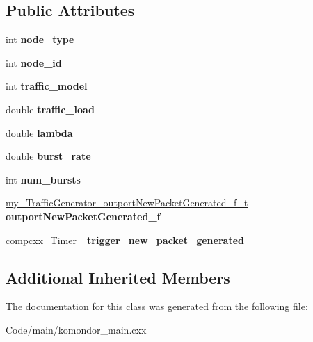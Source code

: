 \subsection*{Public Attributes}
\begin{DoxyCompactItemize}
\item 
\mbox{\label{classcompcxx__TrafficGenerator__24_af8971efad80942b705374072e1f67e58}} 
int {\bfseries node\+\_\+type}
\item 
\mbox{\label{classcompcxx__TrafficGenerator__24_a1f31dd054a79eb90a70db759bb98e9d0}} 
int {\bfseries node\+\_\+id}
\item 
\mbox{\label{classcompcxx__TrafficGenerator__24_a7f36e33fcc5ce1de6a5d1ad3526fd519}} 
int {\bfseries traffic\+\_\+model}
\item 
\mbox{\label{classcompcxx__TrafficGenerator__24_a24b276330056d5d9f7c0bc1625cf6000}} 
double {\bfseries traffic\+\_\+load}
\item 
\mbox{\label{classcompcxx__TrafficGenerator__24_ae46fee48d70bf0c210b4032c14870dc7}} 
double {\bfseries lambda}
\item 
\mbox{\label{classcompcxx__TrafficGenerator__24_a6f3bac5760e965fd2e2ce6660e179619}} 
double {\bfseries burst\+\_\+rate}
\item 
\mbox{\label{classcompcxx__TrafficGenerator__24_a534fd0284a170d6ebede89800d750fba}} 
int {\bfseries num\+\_\+bursts}
\item 
\mbox{\label{classcompcxx__TrafficGenerator__24_a9f4c636d802a30b8264bfa33a42e3db5}} 
\hyperlink{classcompcxx__TrafficGenerator__24_1_1my__TrafficGenerator__outportNewPacketGenerated__f__t}{my\+\_\+\+Traffic\+Generator\+\_\+outport\+New\+Packet\+Generated\+\_\+f\+\_\+t} {\bfseries outport\+New\+Packet\+Generated\+\_\+f}
\item 
\mbox{\label{classcompcxx__TrafficGenerator__24_ad6395abb1d4c54f6ad54588edd43d369}} 
\hyperlink{classcompcxx__Timer__19}{compcxx\+\_\+\+Timer\+\_} {\bfseries trigger\+\_\+new\+\_\+packet\+\_\+generated}
\end{DoxyCompactItemize}
\subsection*{Additional Inherited Members}


The documentation for this class was generated from the following file\+:\begin{DoxyCompactItemize}
\item 
Code/main/komondor\+\_\+main.\+cxx\end{DoxyCompactItemize}
